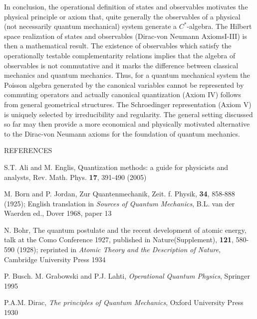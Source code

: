 \documentclass[12pt]{article}
\begin{document}
In conclusion, the operational definition of states and observables motivates the physical principle or axiom that, quite generally  the observables of a physical (not necessarily quantum mechanical) system generate a $C^*$-algebra. The Hilbert space realization of states and observables (Dirac-von Neumann AxiomsI-III) is then a mathematical result. The existence of observables which satisfy the operationally testable complementarity relations implies that the algebra of observables is not commutative and it marks the difference between classical mechanics and quantum mechanics. Thus, for a quantum mechanical system the Poisson algebra generated by the canonical variables cannot be represented by commuting operators and actually canonical quantization  (Axiom IV) follows from general geometrical structures. The Schroedinger representation (Axiom V) is uniquely selected by irreducibility and regularity. 
The general setting discussed so far may then provide a more economical and physically motivated alternative to the Dirac-von Neumann axioms for the foundation of quantum mechanics. 


 

 
 
    

   










\newpage
REFERENCES
\vspace{2mm}

S.T. Ali and M. Englis, Quantization methods: a guide for physicists and analysts, Rev. Math. Phys. {\bf 17}, 391-490 (2005)

M. Born and P. Jordan, Zur Quantenmechanik,   Zeit. f. Physik, {\bf 34}, 858-888 (1925); English translation in  {\em Sources of Quantum Mechanics}, B.L. van der Waerden ed., Dover 1968, paper 13

N. Bohr, The quantum postulate and the recent development of atomic energy, talk at the Como Conference 1927, published in Nature(Supplement), {\bf 121}, 580-590 (1928); reprinted in {\em Atomic Theory and the Description of Nature}, Cambridge University Press 1934 

P. Busch. M. Grabowski and P.J. Lahti, {\em Operational Quantum Physics}, Springer 1995

P.A.M. Dirac, {\em The principles of Quantum Mechanics}, Oxford University Press 1930
\end{document}
